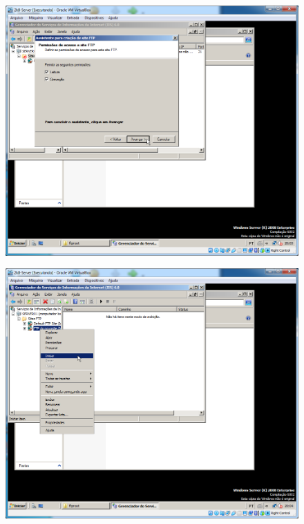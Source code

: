 \documentclass[10pt]{article}
\begin{document}
\begin{figure}[H]
    \centering
    \caption{}
    \label{fig:54115}
    \includegraphics[width=\linewidth]{images/windows_server/ftp/025.png}
\end{figure}
\begin{figure}[H]
    \centering
    \caption{}
    \label{fig:54116}
    \includegraphics[width=\linewidth]{images/windows_server/ftp/027.png}
\end{figure}
\end{document}
